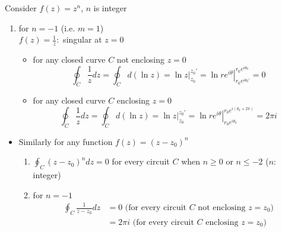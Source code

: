 \begin{example}{Consider $f(z)=z^{n}$, $n$ is integer}
\begin{enumerate}[label = (\alph*)]
\begin{itemize}
\begin{align*}
\oint_C\frac{1}{z^m}dz
&\vc{=}{C,C'}{\text{are reducible}}\oint_{C'}\frac{1}{\left(re^{i\theta}\right)^m}d\left(re^{i\theta}\right) = \frac{i}{r^{m-1}}\int_{\theta=0}^{\theta =2\pi}e^{-im\theta}e^{i\theta}d\theta \\
&= \frac{1}{\left(1-m\right)r^{m-1}}\left.e^{i\left(1-m\right)\theta}\right|_0^{2\pi} = 0
\end{align*}
for any $m\neq 1$ (i.e., $n\neq -1$)
\end{itemize}
\item for $n=-1$ (i.e. $m=1$)\\
$\displaystyle f(z)=\frac{1}{z}\colon$ singular at $z=0$
\begin{itemize}
\item for any closed curve $C$ not enclosing $z=0$
\[
\oint_C\frac{1}{z}dz = \oint_Cd\left(\ln z\right) = \left.\ln z\right|_{z_0}^{z_0'} = \left.\ln re^{i\theta}\right|_{r_0e^{i\theta_0'}}^{r_0e^{i\theta_0}} = 0
\]
\item for any closed curve $C$ enclosing $z=0$
\[
\oint_C\frac{1}{z}dz = \oint_Cd\left(\ln z\right) = \left.\ln z\right|_{z_0}^{z_0'} = \left.\ln re^{i\theta}\right|_{r_0e^{i\theta_0}}^{r_0e^{i\left(\theta_0+2\pi\right)}} = 2\pi i
\]
\end{itemize}
\end{enumerate}
\begin{itemize}
\item Similarly for any function $f(z)=\left(z-z_0\right)^n$
\begin{enumerate}[label = (\alph*)]
\item $\displaystyle\oint_C\left(z-z_0\right)^ndz = 0$ for every circuit $C$ when $n\geq 0$ or $n\leq -2$ ($n\colon$ integer)
\item for $n=-1$ 
\begin{align*}
\oint_C\frac{1}{z-z_0}dz &= 0 \text{ (for every circuit $C$ not enclosing $z=z_0$)}\\
&= 2\pi i \text{ (for every circuit $C$ enclosing $z=z_0$)}
\end{align*}
\end{enumerate}
\end{itemize}
\end{example}
